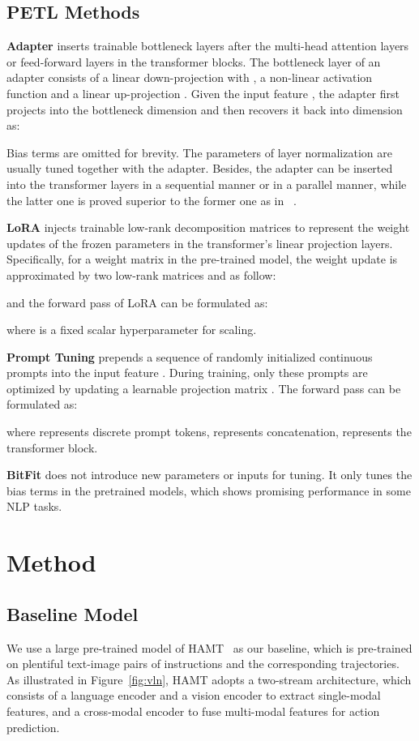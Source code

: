 \documentclass[10pt,twocolumn,letterpaper]{article}
\begin{document}
\subsection{PETL Methods}

\noindent\textbf{Adapter} inserts trainable bottleneck layers after the multi-head attention layers or feed-forward layers in the transformer blocks. The bottleneck layer of an adapter consists of a linear down-projection with , a non-linear activation function  and a linear up-projection .  Given the input feature , the adapter first projects  into the  bottleneck dimension and then recovers it back into  dimension as:

Bias terms are omitted for brevity.
The parameters of layer normalization are usually tuned together with the adapter.
Besides, the adapter can be inserted into the transformer layers in a sequential manner or in a parallel manner, while the latter one is proved superior to the former one as in ~\cite{unified-petl}.

\noindent\textbf{LoRA} injects trainable low-rank decomposition matrices to represent the weight updates of the frozen parameters in the transformer's linear projection layers. Specifically, for a weight matrix  in the pre-trained model, the weight update  is approximated by two low-rank matrices  and  as follow:

and the forward pass of LoRA can be formulated as:

where  is a fixed scalar hyperparameter for scaling.

\noindent\textbf{Prompt Tuning} prepends a sequence of randomly initialized continuous prompts  into the input feature . During training, only these prompts are optimized by updating a learnable projection matrix . The forward pass can be formulated as:

where  represents discrete prompt tokens,  represents concatenation,  represents the transformer block.



\noindent\textbf{BitFit} does not introduce new parameters or inputs for tuning. It only tunes the bias terms in the pretrained models, which shows promising performance in some NLP tasks. 


\section{Method}
\vspace{-3pt}
\subsection{Baseline Model}
\label{sec:transformer_model}
\vspace{-5pt}
We use a large pre-trained model of HAMT~\cite{hamt} as our baseline, which is pre-trained on plentiful text-image pairs of instructions and the corresponding trajectories.
As illustrated in Figure~\ref{fig:vln}, HAMT adopts a two-stream architecture, which consists of a language encoder and a vision encoder to extract single-modal features, and a cross-modal encoder to fuse multi-modal features for action prediction.  
\end{document}
